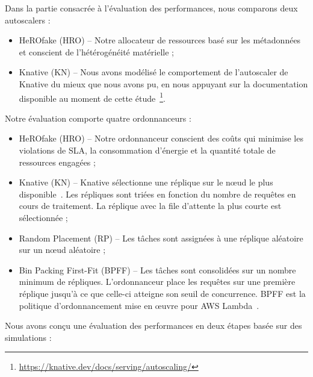 Dans la partie consacrée à l'évaluation des performances, nous comparons deux autoscalers :

\begin{itemize}
    \item HeROfake (HRO) -- Notre allocateur de ressources basé sur les métadonnées et conscient de l'hétérogénéité matérielle ;
    \item Knative (KN) -- Nous avons modélisé le comportement de l'autoscaler de Knative du mieux que nous avons pu, en nous appuyant sur la documentation disponible au moment de cette étude~\footnote{\href{https://knative.dev/docs/serving/autoscaling/}{https://knative.dev/docs/serving/autoscaling/}}.
\end{itemize}

Notre évaluation comporte quatre ordonnanceurs :

\begin{itemize}
    \item HeROfake (HRO) -- Notre ordonnanceur conscient des coûts qui minimise les violations de \gls{SLA}, la consommation d'énergie et la quantité totale de ressources engagées ;
    \item Knative (KN) -- Knative sélectionne une réplique sur le nœud le plus disponible~\cite{sureshENSUREEfficientScheduling2020}. Les répliques sont triées en fonction du nombre de requêtes en cours de traitement. La réplique avec la file d'attente la plus courte est sélectionnée ;
    \item Random Placement (RP) -- Les tâches sont assignées à une réplique aléatoire sur un nœud aléatoire ;
    \item Bin Packing First-Fit (\gls{BPFF}) -- Les tâches sont consolidées sur un nombre minimum de répliques. L'ordonnanceur place les requêtes sur une première réplique jusqu'à ce que celle-ci atteigne son seuil de concurrence. \gls{BPFF} est la politique d'ordonnancement mise en œuvre pour \gls{AWS} Lambda~\cite{wangPeekingCurtainsServerlessb}.
\end{itemize}

Nous avons conçu une évaluation des performances en deux étapes basée sur des simulations :

